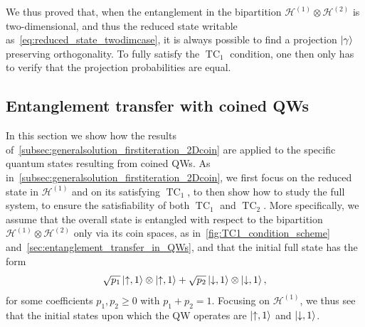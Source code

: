 \documentclass[
	aps, pra,
	superscriptaddress, twocolumn,
	floatfix,
	10pt
]{revtex4-1}
\newcommand{\on}[1]{\operatorname{#1}}
\newcommand{\parTitle}[1]{\noindent{\color{Mahogany}(\emph{#1})}}
\newcommand{\calH}{{\mathcal{H}}}
\newcommand{\commale}[1]{{\textcolor{red} {\it{[Note (Ale): #1]}}}}
\renewcommand{\parTitle}[1]{}
\begin{document}
We thus proved that, when the entanglement in the bipartition $\calH^{(1)}\otimes\calH^{(2)}$ is two-dimensional, and thus the reduced state writable as~\cref{eq:reduced_state_twodimcase}, it is always possible to find a projection $\ket\gamma$ preserving orthogonality.
To fully satisfy the $\on{TC}_1$ condition, one then only has to verify that the projection probabilities are equal.

\subsection{Entanglement transfer with coined QWs}
\label{subsec:analytical_results_QWs}

\parTitle{Section outline}
In this section we show how the results of~\cref{subsec:generalsolution_firstiteration_2Dcoin} are applied to the specific quantum states resulting from coined QWs.
As in~\cref{subsec:generalsolution_firstiteration_2Dcoin}, we first focus on the reduced state in $\calH^{(1)}$ and on its satisfying $\on{TC}_1$, to then show how to study the full system, to ensure the satisfiability of both $\on{TC}_1$ and $\on{TC}_2$.
More specifically, we assume that the overall state is entangled with respect to the bipartition $\calH^{(1)}\otimes\calH^{(2)}$ only via its coin spaces, as in~\cref{fig:TC1_condition_scheme} and~\cref{sec:entanglement_transfer_in_QWs}, and that the initial full state has the form
\begin{equation}
    \sqrt{p_1} \ket{\uparrow,1}\otimes\ket{\uparrow,1} +
    \sqrt{p_2} \ket{\downarrow,1}\otimes\ket{\downarrow,1},
\end{equation}
for some coefficients $p_1,p_2\ge0$ with $p_1+p_2=1$.
Focusing on $\calH^{(1)}$, we thus see that the initial states upon which the QW operates are $\ket{\uparrow,1}$ and $\ket{\downarrow,1}$.
\end{document}
